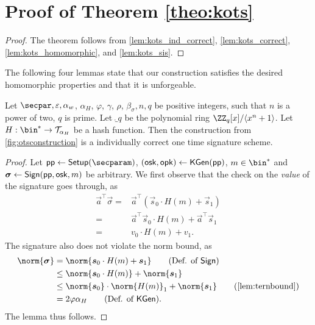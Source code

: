 \section{Proof of Theorem \ref{theo:kots}}\label{app:proofs}
\begin{proof}
The theorem follows from \autoref{lem:kots_ind_correct}, \autoref{lem:kots_correct}, \autoref{lem:kots_homomorphic}, and \autoref{lem:kots_sis}.
\end{proof}

The following four lemmas state that our construction satisfies the desired homomorphic properties and that it is unforgeable.
\begin{lemma}\label{lem:kots_ind_correct}
Let $\secpar, \varepsilon, \alpha_w$, $\alpha_H$, $\varphi$, $\gamma$, $\rho$, $\beta_\sigma,n,q$ be positive integers, such that $n$ is a power of two, $q$ is prime.
  Let $\ring_q$ be the polynomial ring $\ZZ_q[x]/\langle x^n+1\rangle$.
Let $H : \bin^* \to \tern_{\alpha_H}$ be a hash function.
  Then the construction from \autoref{fig:otsconstruction} is a individually correct one time signature scheme.
\end{lemma}
\begin{proof}
  Let $\params \gets \setup(\secparam)$, $(\mathsf{osk},\mathsf{opk}) \gets \mathsf{KGen}(\mathsf{pp})$, $m\in\bin^*$ and $\boldsymbol{\sigma} \gets \mathsf{Sign}(\mathsf{pp},\mathsf{osk},m)$ be arbitrary.
  We first observe that the check on the \emph{value} of the signature goes through, as
  \begin{align*}
    \vec{a}^\intercal\vec{\sigma}
    ={}&\vec{a}^\intercal(\vec{s}_0\cdot H(m) + \vec{s}_1)\tag{Def. of $\sign$}\\
    ={}&\vec{a}^\intercal\vec{s}_0\cdot H(m) + \vec{a}^\intercal\vec{s}_1 \tag{Distributivity}\\
    ={}&v_0\cdot H(m) + v_1. \tag{Def. of $\kgen$}
  \end{align*}
  The signature also does not violate the norm bound, as
  \begin{align*}
    \norm{\vec{\sigma}}
    ={}&\norm{\vec{s}_0\cdot H(m) + \vec{s}_1} \tag{Def. of $\sign$}\\
    \leq{}&\norm{\vec{s}_0\cdot H(m)} + \norm{\vec{s}_1}\\
    \leq{}&\norm{\vec{s}_0}\cdot\norm{H(m)}_1 + \norm{\vec{s}_1} \tag{\autoref{lem:ternbound}}\\
    ={}&2\varphi\alpha_H \tag{Def. of $\kgen$}.
  \end{align*}
  The lemma thus follows.
\end{proof}


